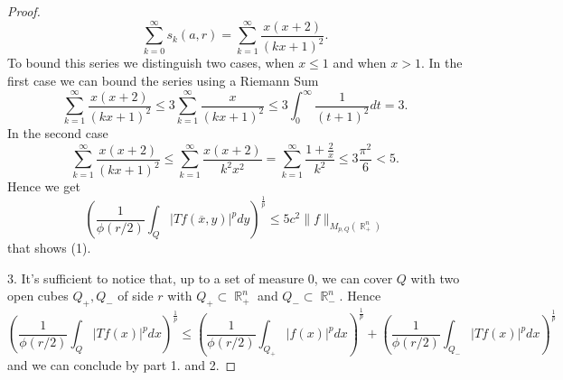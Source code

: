 \documentclass[12pt]{article}
\theoremstyle{definition}
\DeclareMathOperator\rr{\mathbb{R}}
\begin{document}
\begin{proof}
\[\sum_{k=0}^\infty s_k(a,r)= \sum_{k=1}^\infty \frac{x(x+2)}{(kx+1)^2}.\]
To bound this series we distinguish two cases, when $x\le 1$ and when $x>1$. In the first case we can bound the series using a Riemann Sum
\[ \sum_{k=1}^\infty \frac{x(x+2)}{(kx+1)^2} \le 3\sum_{k=1}^\infty \frac{x}{(kx+1)^2}\le 3 \int_0^\infty \frac{1}{(t+1)^2}dt=3. \]
In the second case
\[  \sum_{k=1}^\infty \frac{x(x+2)}{(kx+1)^2}  \le \sum_{k=1}^\infty \frac{x(x+2)}{k^2x^2}=\sum_{k=1}^\infty \frac{1+\frac{2}{x}}{k^2} \le 3 \frac{\pi^2}{6}<5.\]
Hence we get 
\[\left(\frac{1}{\phi(r/2)}\int_Q|Tf(\overline x,y)|^p dy\right)^{\frac{1}{p}} \le 5c^2 \| f\|_{M_{p,Q}(\rr^n_+)} \]
that shows (1). 

3. It's sufficient to notice that, up to a set of measure 0,  we can cover $Q$ with two open cubes $Q_+,Q_-$ of side $r$ with $Q_+\subset \rr^n_+$ and $Q_-\subset \rr^n_-.$ Hence
\[ \left(\frac{1}{\phi(r/2)}\int_Q |Tf(x)|^pdx \right)^{\frac{1}{p}}\le\left(\frac{1}{\phi(r/2)}\int_{Q_+} |f(x)|^pdx \right)^{\frac{1}{p}}+\left(\frac{1}{\phi(r/2)}\int_{Q_-} |Tf(x)|^pdx \right)^{\frac{1}{p}} \]
and we can conclude by part 1. and 2.
\end{proof} 
\end{document}
